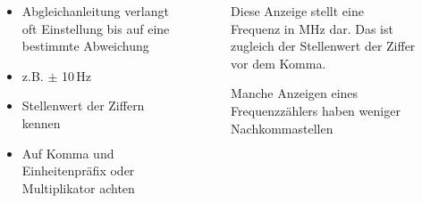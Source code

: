 \begin{frame}
\begin{columns}
    \begin{column}{0.48\textwidth}
    \begin{itemize}
  \item Abgleichanleitung verlangt oft Einstellung bis auf eine bestimmte Abweichung
  \item z.B.  $\pm$ 10 Hz
  \item Stellenwert der Ziffern kennen
  \item Auf Komma und Einheitenpräfix oder Multiplikator achten
  \end{itemize}

    \end{column}
   \begin{column}{0.48\textwidth}
       
\begin{figure}
    \caption{\scriptsize Diese Anzeige stellt eine Frequenz in MHz dar. Das ist zugleich der Stellenwert der Ziffer vor dem Komma.}
    \label{e_frequenzzaehler_stellen}
\end{figure}


\begin{figure}
    \caption{\scriptsize Manche Anzeigen eines Frequenzzählers haben weniger Nachkommastellen}
    \label{e_frequenzzaehler_weniger_stellen}
\end{figure}


   \end{column}
\end{columns}

\end{frame}

\begin{frame}
\end{frame}

